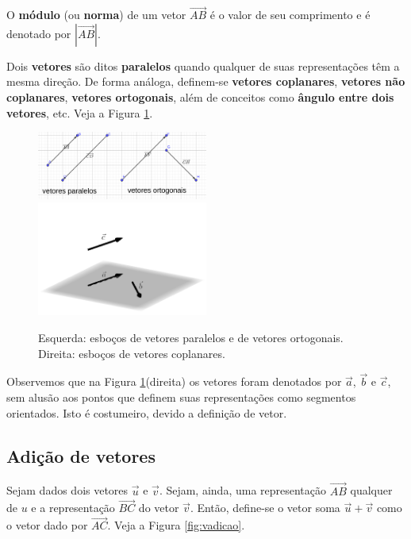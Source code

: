 O {\bf módulo} (ou {\bf norma}) de um vetor $\overrightarrow{AB}$ é o valor de seu comprimento e é denotado por $|\overrightarrow{AB}|$.

Dois {\bf vetores} são ditos {\bf paralelos}  quando qualquer de suas representações têm a mesma direção. De forma análoga, definem-se {\bf vetores coplanares}, {\bf vetores não coplanares}, {\bf vetores ortogonais}, além de conceitos como {\bf ângulo entre dois vetores}, etc. Veja a Figura \ref{fig:vetorrel}.

\begin{figure}[h!]
  \centering
  \includegraphics[width=0.5\textwidth]{./cap_vetor/dados/fig_vetorrel/fig_vetorrel}~
  \includegraphics[width=0.5\textwidth]{./cap_vetor/dados/fig_vcolineares/fig_vcolineares}
  \caption{Esquerda: esboços de vetores paralelos e de vetores ortogonais. Direita: esboços de vetores coplanares.}
  \label{fig:vetorrel}
\end{figure}

Observemos que na Figura \ref{fig:vetorrel}(direita) os vetores foram denotados por $\vec{a}$, $\vec{b}$ e $\vec{c}$, sem alusão aos pontos que definem suas representações como segmentos orientados. Isto é costumeiro, devido a definição de vetor.

\subsection{Adição de vetores}

Sejam dados dois vetores $\vec{u}$ e $\vec{v}$. Sejam, ainda, uma representação $\overrightarrow{AB}$ qualquer de $u$ e a representação $\overrightarrow{BC}$ do vetor $\vec{v}$. Então, define-se o vetor soma $\vec{u}+\vec{v}$ como o vetor dado por $\overrightarrow{AC}$. Veja a Figura \ref{fig:vadicao}.

